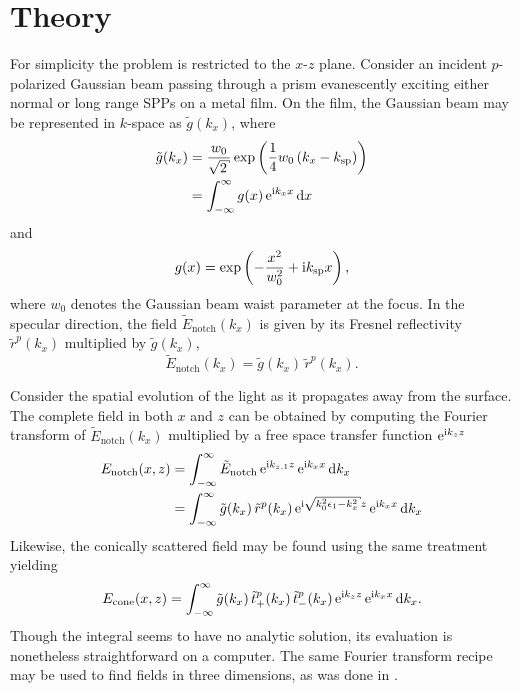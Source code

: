 \section{Theory} \label{sec:interferencetheory}
For simplicity the problem is restricted to the $x$-$z$ plane.  Consider an
incident $p$-polarized Gaussian beam passing through a prism evanescently
exciting either normal or long range SPPs on a metal film.  On the film,
the Gaussian beam may be represented in $k$-space as $\tilde{g}(k_x)$,
where
\begin{align}
\tilde{g}(k_x) &= \frac{w_0}{\sqrt{2}} \exp\left(\frac{1}{4}w_0\left(k_x - \ksp\right)\right)\\
&= \intinfty g(x)\, \me^{\mi k_x x} \md x
\end{align}
and
\begin{equation}
g(x) = \exp\left(-\frac{x^2}{w_0^2} + {\mathrm{i}} k_\mathrm{sp} x\right),
\end{equation}
where $w_0$ denotes the Gaussian beam waist parameter at the focus.  In the
specular direction, the field $\tilde{E}_\mathrm{notch}(k_x)$ is given by its
Fresnel reflectivity $\tilde{r}^p(k_x)$ multiplied by $\tilde{g}(k_x)$,
\begin{equation}
\tilde{E}_\mathrm{notch}(k_x)=\tilde{g}(k_x)\,\tilde{r}^p(k_x).
\end{equation}

Consider the spatial evolution of the light as it propagates
away from the surface.
The complete field in both $x$ and $z$ can be obtained by computing
the Fourier transform of $\tilde{E}_\mathrm{notch}(k_x)$ multiplied 
by a free space transfer function ${\mathrm{e}}^{{\mathrm{i}} k_{z} z}$
\begin{align}
E_\mathrm{notch}(x,z) &= \intinfty \tilde{E}_\mathrm{notch}\, \me^{\mi k_{z,1} z}\, \me^{\mi k_x x} \md k_x\\
 &= \intinfty \tilde{g}(k_x)\, \tilde{r}^p(k_x)\, \me^{\mi \sqrt{k_0^2 \epsilon_1 - k_x^2}z}\, \me^{\mi k_x x} \md k_x
\label{eqn:fourier123}
\end{align}
Likewise, the conically scattered field may be found using the same
treatment yielding
\begin{align}
E_\text{cone}(x,z) = \int_{-\infty}^{\infty} \tilde{g}(k_x)\, 
\tilde{t}^p_+(k_x)\, \tilde{t}^p_-(k_x)\,{\mathrm{e}}^{{\mathrm{i}} k_z z}\, {\mathrm{e}}^{{\mathrm{i}} k_x x}
\,\mathrm{d} k_x.
\label{eqn:fourier321}
\end{align}
Though the integral seems to have no analytic solution, its evaluation is
nonetheless straightforward on a computer.  The same Fourier transform
recipe may be used to find fields in three dimensions, as was done in
.

